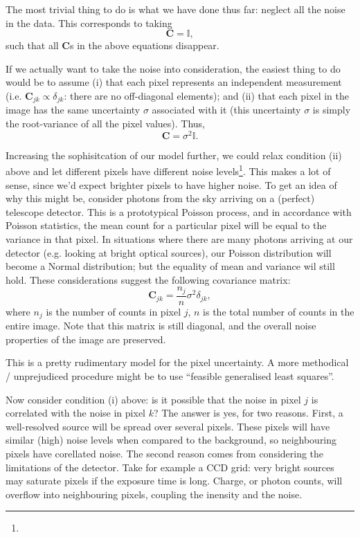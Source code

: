 \documentclass[letterpaper, 11pt]{article}
\def\TODO#1{ {\color{black}{\bf TODO: {#1}}}\xspace}
\begin{document}
The most trivial thing to do is what we have done thus far: neglect all the noise in the data. This corresponds to taking
\begin{equation}
	\mathbf C = \mathbb{I},
\end{equation}
such that all $\mathbf C$s in the above equations disappear.

If we actually want to take the noise into consideration, the easiest thing to do would be to assume (i) that each pixel represents an independent measurement (i.e. $\mathbf{C}_{jk}\propto \delta_{jk}$: there are no off-diagonal elements); and (ii) that each pixel in the image has the same uncertainty $\sigma$ associated with it (this uncertainty $\sigma$ is simply the root-variance of all the pixel values). Thus,
\begin{equation}
	\mathbf C = \sigma^2\mathbb{I}.
\end{equation}

Increasing the sophisitcation of our model further, we could relax condition (ii) above and let different pixels have different noise levels\footnote{\TODO{Cato: what does ``heteroscedastic'' mean? Relevant?}}. This makes a lot of sense, since we'd expect brighter pixels to have higher noise. To get an idea of why this might be, consider photons from the sky arriving on a (perfect) telescope detector. This is a prototypical Poisson process, and in accordance with Poisson statistics, the mean count for a particular pixel will be equal to the variance in that pixel. In situations where there are many photons arriving at our detector (e.g. looking at bright optical sources), our Poisson distribution will become a Normal distribution; but the equality of mean and variance wil still hold. These considerations suggest the following covariance matrix:
\begin{equation}\label{eqn:covmat}
	\mathbf{C}_{jk} = \frac{n_j}{n}\sigma^2\delta_{jk},
\end{equation}
where $n_j$ is the number of counts in pixel $j$, $n$ is the total number of counts in the entire image. Note that this matrix is still diagonal, and the overall noise properties of the image are preserved.

This is a pretty rudimentary model for the pixel uncertainty. A more methodical / unprejudiced procedure might be to use ``feasible generalised least squares''.

Now consider condition (i) above: is it possible that the noise in pixel $j$ is correlated with the noise in pixel $k$? The answer is yes, for two reasons. First, a well-resolved source will be spread over several pixels. These pixels will have similar (high) noise levels when compared to the background, so neighbouring pixels have corellated noise. The second reason comes from considering the limitations of the detector. Take for example a CCD grid: very bright sources may saturate pixels if the exposure time is long. Charge, or photon counts, will overflow into neighbouring pixels, coupling the inensity and the noise.
\end{document}
